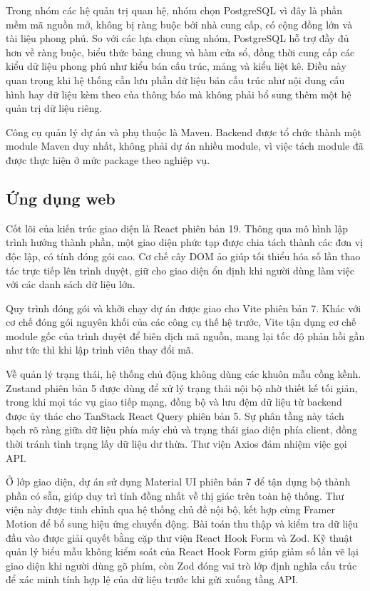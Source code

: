 \documentclass[12pt,a4paper,oneside]{report}
\begin{document}
Trong nhóm các hệ quản trị quan hệ, nhóm chọn PostgreSQL vì đây là phần mềm mã nguồn mở, không bị ràng buộc bởi nhà cung cấp, có cộng đồng lớn và tài liệu phong phú. So với các lựa chọn cùng nhóm, PostgreSQL hỗ trợ đầy đủ hơn về ràng buộc, biểu thức bảng chung và hàm cửa sổ, đồng thời cung cấp các kiểu dữ liệu phong phú như kiểu bán cấu trúc, mảng và kiểu liệt kê. Điều này quan trọng khi hệ thống cần lưu phần dữ liệu bán cấu trúc như nội dung cấu hình hay dữ liệu kèm theo của thông báo mà không phải bổ sung thêm một hệ quản trị dữ liệu riêng.

Công cụ quản lý dự án và phụ thuộc là Maven. Backend được tổ chức thành một module Maven duy nhất, không phải dự án nhiều module, vì việc tách module đã được thực hiện ở mức package theo nghiệp vụ.

\subsection{Ứng dụng web}

Cốt lõi của kiến trúc giao diện là React phiên bản 19. Thông qua mô hình lập trình hướng thành phần, một giao diện phức tạp được chia tách thành các đơn vị độc lập, có tính đóng gói cao. Cơ chế cây DOM ảo giúp tối thiểu hóa số lần thao tác trực tiếp lên trình duyệt, giữ cho giao diện ổn định khi người dùng làm việc với các danh sách dữ liệu lớn.

Quy trình đóng gói và khởi chạy dự án được giao cho Vite phiên bản 7. Khác với cơ chế đóng gói nguyên khối của các công cụ thế hệ trước, Vite tận dụng cơ chế module gốc của trình duyệt để biên dịch mã nguồn, mang lại tốc độ phản hồi gần như tức thì khi lập trình viên thay đổi mã.

Về quản lý trạng thái, hệ thống chủ động không dùng các khuôn mẫu cồng kềnh. Zustand phiên bản 5 được dùng để xử lý trạng thái nội bộ nhờ thiết kế tối giản, trong khi mọi tác vụ giao tiếp mạng, đồng bộ và lưu đệm dữ liệu từ backend được ủy thác cho TanStack React Query phiên bản 5. Sự phân tầng này tách bạch rõ ràng giữa dữ liệu phía máy chủ và trạng thái giao diện phía client, đồng thời tránh tình trạng lấy dữ liệu dư thừa. Thư viện Axios đảm nhiệm việc gọi API.

Ở lớp giao diện, dự án sử dụng Material UI phiên bản 7 để tận dụng bộ thành phần có sẵn, giúp duy trì tính đồng nhất về thị giác trên toàn hệ thống. Thư viện này được tinh chỉnh qua hệ thống chủ đề nội bộ, kết hợp cùng Framer Motion để bổ sung hiệu ứng chuyển động. Bài toán thu thập và kiểm tra dữ liệu đầu vào được giải quyết bằng cặp thư viện React Hook Form và Zod. Kỹ thuật quản lý biểu mẫu không kiểm soát của React Hook Form giúp giảm số lần vẽ lại giao diện khi người dùng gõ phím, còn Zod đóng vai trò lớp định nghĩa cấu trúc để xác minh tính hợp lệ của dữ liệu trước khi gửi xuống tầng API.
\end{document}
